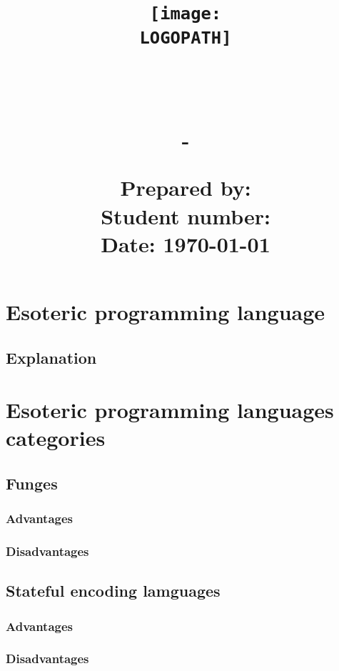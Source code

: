 \documentclass[12pt]{article}
\title{
    \texttt{[image: \\LOGOPATH]} \\
    \begin{center}
        \hfill \\
        \Large{\DEPARTEMENT} \\
        \Large{\COURSENUM\;-\;\COURSENAME} \\
        \vfill
        \textbf{\LARGE{\REPORTTITLE}}
    \end{center}
    \mbox{}
    \vfill
    \date{}
    \begin{flushleft}
        \Large{\textbf{Prepared by:} \STUDENTNAME} \\
        \Large{\textbf{Student number:} \STUDENTID} \\
        \Large{\textbf{Date:} \today}
    \end{flushleft}
}
\begin{document}
\maketitle

\newpage
\tableofcontents
\newpage

\section{Esoteric programming language \hfill {}}
\subsection{Explanation}
\newpage

\section{Esoteric programming languages categories \hfill {}}
\subsection{Funges}
\subsubsection{Advantages}
\subsubsection{Disadvantages}
\subsection{Stateful encoding lamguages}
\subsubsection{Advantages}
\subsubsection{Disadvantages}
\newpage

\end{document}
